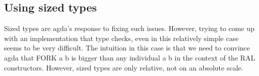 \documentclass[12pt,twoside,notitlepage]{report}
\begin{document}
\begin{code}
\\
\>[0]\<[4]%
\>[4] \AgdaSymbol{:} \AgdaSymbol{\{} \AgdaSymbol{:} \AgdaSymbol{\}}        \<%
\\
\>[0]\<[4]%
\>[4]     \<%
\\
\>[0]\<[4]%
\>[4]   \AgdaSymbol{|}  \AgdaSymbol{=}   \<%
\\
\>[0]\<[4]%
\>[4]   \AgdaSymbol{|}  \AgdaSymbol{(} \AgdaInductiveConstructor{,} \AgdaSymbol{)} \AgdaSymbol{=}   \AgdaSymbol{(}  \AgdaSymbol{)}\<%
\\
\end{code}

\subsection{Using sized types}

Sized types are agda's response to fixing such issues. However, trying to come up with an implementation that type checks, even in this relatively simple case seems to be very difficult. The intuition in this case is that we need to convince agda that FORK a b is bigger than any individual a b in the context of the RAL constructors. However, sized types are only relative, not on an absolute scale.
\end{document}

